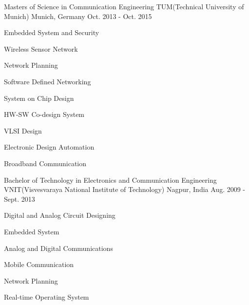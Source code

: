

\begin{cventries}


  \cventry
    {Masters of Science in Communication Engineering} %
    {TUM(Technical University of Munich)} %
    {Munich, Germany} %
    {Oct. 2013 - Oct. 2015} %
    {
      \begin{cvitems_2} %
          \item {Embedded System and Security}
          \item {Wireless Sensor Network}
          \item {Network Planning}
          \item {Software Defined Networking}
          \item {System on Chip Design}
          \item {HW-SW Co-design System}
          \item {VLSI Design}
          \item {Electronic Design Automation}
          \item {Broadband Communication}
      \end{cvitems_2}
    }


  \cventry
    {Bachelor of Technology in Electronics and Communication Engineering} %
    {VNIT(Visvesvaraya National Institute of Technology)} %
    {Nagpur, India} %
    {Aug. 2009 - Sept. 2013} %
    {
      \begin{cvitems_2} %
        \item {Digital and Analog Circuit Designing}
        \item {Embedded System}
        \item {Analog and Digital Communications}
        \item {Mobile Communication}
        \item {Network Planning}
        \item {Real-time Operating System}
      \end{cvitems_2}
    }

\end{cventries}
